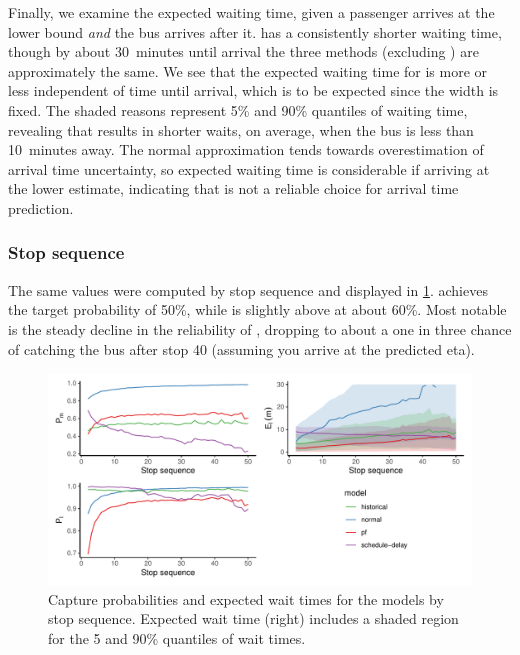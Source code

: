 Finally, we examine the expected waiting time, given a passenger arrives at the lower bound \emph{and} the bus arrives after it. \Fpf{} has a consistently shorter waiting time, though by about 30~minutes until arrival the three methods (excluding \Fnorm{}) are approximately the same. We see that the expected waiting time for \Fsched{} is more or less independent of time until arrival, which is to be expected since the width is fixed. The shaded reasons represent 5\% and 90\% quantiles of waiting time, revealing that \Fpf{} results in shorter waits, on average, when the bus is less than 10~minutes away. The normal approximation tends towards overestimation of arrival time uncertainty, so expected waiting time is considerable if arriving at the lower estimate, indicating that \Fnorm{} is not a reliable choice for arrival time prediction.


\subsubsection{Stop sequence}

The same values were computed by stop sequence and displayed in \cref{fig:model_results_pr_stop}. \Fhist{} achieves the target probability of 50\%, while \Fpf{} is slightly above at about 60\%. Most notable is the steady decline in the reliability of \Fsched{}, dropping to about a one in three chance of catching the bus after stop 40 (assuming you arrive at the predicted \gls{eta}).


\begin{knitrout}\small
{}\color{fgcolor}\begin{figure}
\includegraphics[width=\textwidth]{figure/model_results_pr_stop-1} \caption[Capture probabilities and expected wait times for the models by stop sequence]{Capture probabilities and expected wait times for the models by stop sequence. Expected wait time (right) includes a shaded region for the 5 and 90\% quantiles of wait times.}\label{fig:model_results_pr_stop}
\end{figure}


\end{knitrout}

